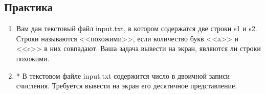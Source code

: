 \documentclass[12pt]{article}
\begin{document}
\subsection*{Практика}
\begin{enumerate}
\item Вам дан текстовый файл input.txt, в котором содержатся две строки s1 и s2. Строки называются <<похожими>>, если количество букв <<a>> и <<c>> в них совпадают. Ваша задача вывести на экран, являются ли строки похожими.

\item* В текстовом файле input.txt содержится число в двоичной записи счисления. Требуется вывести на экран его десятичное представление.


\end{enumerate}
\end{document}

